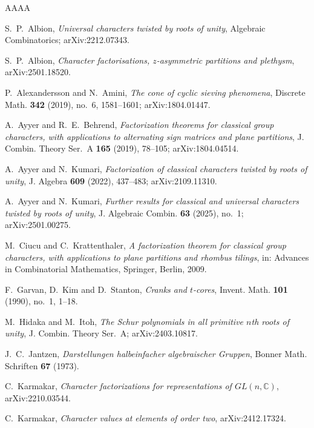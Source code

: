 \documentclass[11pt,reqno]{amsart}
\theoremstyle{plain}
\theoremstyle{definition}
\newcommand{\CC}{\mathbb{C}}
\begin{document}
\begin{thebibliography}{AAAA}

 S.~P.~Albion, \emph{Universal characters twisted by roots of unity},
Algebraic Combinatorics; arXiv:2212.07343.

 S.~P.~Albion, \emph{Character factorisations, $z$-asymmetric partitions and
plethysm}, arXiv:2501.18520.

 P.~Alexandersson and N.~Amini, \emph{The cone of cyclic sieving
phenomena}, Discrete Math. \textbf{342} (2019), no.~6, 1581--1601; arXiv:1804.01447.

 A.~Ayyer and R.~E.~Behrend, \emph{Factorization theorems for classical group
characters, with applications to alternating sign matrices and plane partitions}, J. Combin. Theory
Ser.~A \textbf{165} (2019), 78--105; arXiv:1804.04514.

 A.~Ayyer and N.~Kumari, \emph{Factorization of classical characters twisted by
roots of unity}, J. Algebra \textbf{609} (2022), 437--483; arXiv:2109.11310.

 A.~Ayyer and N.~Kumari, \emph{Further results for classical and universal
characters twisted by roots of unity}, J. Algebraic Combin. \textbf{63} (2025), no.~1;
arXiv:2501.00275.

 M.~Ciucu and C.~Krattenthaler, \emph{A factorization theorem for classical
group characters, with applications to plane partitions and rhombus tilings}, in: Advances in
Combinatorial Mathematics, Springer, Berlin, 2009.

 F.~Garvan, D.~Kim and D.~Stanton, \emph{Cranks and $t$-cores},
Invent. Math. \textbf{101} (1990), no.~1, 1--18.

 M.~Hidaka and M.~Itoh, \emph{The Schur polynomials in all primitive $n$th roots
of unity}, J. Combin. Theory Ser.~A; arXiv:2403.10817.

 J.~C.~Jantzen, \emph{Darstellungen halbeinfacher algebraischer Gruppen},
Bonner Math. Schriften \textbf{67} (1973).

 C.~Karmakar, \emph{Character factorizations for representations of
$GL(n,\CC)$}, arXiv:2210.03544.

 C.~Karmakar, \emph{Character values at elements of order two},
arXiv:2412.17324.


\end{thebibliography}
\end{document}
